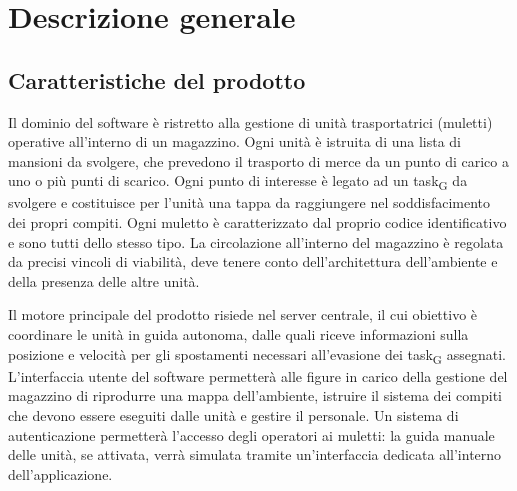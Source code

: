 \section{Descrizione generale}


\subsection{Caratteristiche del prodotto}
Il dominio del software è ristretto alla gestione di unità trasportatrici (muletti) operative all’interno di un magazzino. Ogni unità è istruita di una lista di mansioni da svolgere, che prevedono il trasporto di merce da un punto di carico a uno o più punti di scarico. Ogni punto di interesse è legato ad un \gls{task}\textsubscript{G} da svolgere e costituisce per l’unità una tappa da raggiungere nel soddisfacimento dei propri compiti. Ogni muletto è caratterizzato dal proprio codice identificativo e sono tutti dello stesso tipo.
La circolazione all’interno del magazzino è regolata da precisi vincoli di viabilità, deve tenere conto dell’architettura dell’ambiente e della presenza delle altre unità.

Il motore principale del prodotto risiede nel server centrale, il cui obiettivo è coordinare le unità in guida autonoma, dalle quali riceve informazioni sulla posizione e velocità per gli spostamenti necessari all’evasione dei \gls{task}\textsubscript{G} assegnati. L’interfaccia utente del software permetterà alle figure in carico della gestione del magazzino di riprodurre una mappa dell’ambiente, istruire il sistema dei compiti che devono essere eseguiti dalle unità e gestire il personale. Un sistema di autenticazione permetterà l’accesso degli operatori ai muletti: la guida manuale delle unità, se attivata, verrà simulata tramite un’interfaccia dedicata all’interno dell’applicazione.

